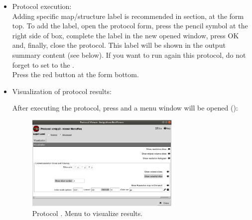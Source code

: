 \begin{itemize}
\begin{itemize}
\begin{itemize}
        \end{itemize}
    \end{itemize}
  \item Protocol execution:\\
  Adding specific map/structure label is recommended in  section, at the form top. To add the label, open the protocol form, press the pencil symbol at the right side of  box, complete the label in the new opened window, press OK and, finally, close the protocol. This label will be shown in the output summary content (see below). If you want to run again this protocol, do not forget to set to  the .\\
  Press the  red button at the form bottom.
  
  \item Visualization of protocol results:
  
  After executing the protocol, press  and a menu window will be opened ():
  
  \begin{figure}[H]
     \centering 
     \captionsetup{width=.9\linewidth} 
     \includegraphics[width=0.70\textwidth]{Images_appendix/Fig209.pdf}
     \caption{Protocol . Menu to visualize results.}
     \label{fig:app_localMonoRes_2}
    \end{figure}
    

\end{itemize}
